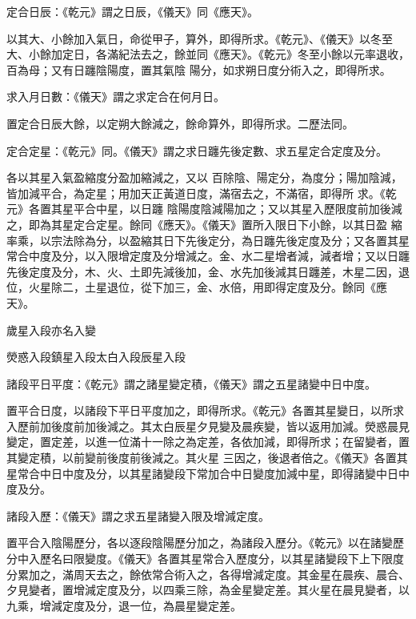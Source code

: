 \begin{pinyinscope}
 定合日辰：《乾元》謂之日辰，《儀天》同《應天》。



 以其大、小餘加入氣日，命從甲子，算外，即得所求。《乾元》、《儀天》以冬至大、小餘加定日，各滿紀法去之，餘並同《應天》。《乾元》冬至小餘以元率退收，百為母；又有日躔陰陽度，置其氣陰
 陽分，如求朔日度分術入之，即得所求。



 求入月日數：《儀天》謂之求定合在何月日。



 置定合日辰大餘，以定朔大餘減之，餘命算外，即得所求。二歷法同。



 定合定星：《乾元》同。《儀天》謂之求日躔先後定數、求五星定合定度及分。



 各以其星入氣盈縮度分盈加縮減之，又以
 百除陰、陽定分，為度分；陽加陰減，皆加減平合，為定星；用加天正黃道日度，滿宿去之，不滿宿，即得所
 求。《乾元》各置其星平合中星，以日躔
 陰陽度陰減陽加之；又以其星入歷限度前加後減之，即為其星定合定星。餘同《應天》。《儀天》置所入限日下小餘，以其日盈
 縮率乘，以宗法除為分，以盈縮其日下先後定分，為日躔先後定度及分；又各置其星常合中度及分，以入限增定度及分增減之。金、水二星增者減，減者增；又以日躔先後定度及分，木、火、土即先減後加，金、水先加後減其日躔差，木星二因，退位，火星除二，土星退位，從下加三，金、水倍，用即得定度及分。餘同《應天》。



 歲星入段亦名入變



 熒惑入段鎮星入段太白入段辰星入段



 諸段平日平度：《乾元》謂之諸星變定積，《儀天》謂之五星諸變中日中度。



 置平合日度，以諸段下平日平度加之，即得所求。《乾元》各置其星變日，以所求入歷前加後度前加後減之。其太白辰星夕見變及晨疾變，皆以返用加減。熒惑晨見變定，置定差，以進一位滿十一除之為定差，各依加減，即得所求；在留變者，置其變定積，以前變前後度前後減之。其火星
 三因之，後退者倍之。《儀天》各置其星常合中日中度及分，以其星諸變段下常加合中日變度加減中星，即得諸變中日中度及分。



 諸段入歷：《儀天》謂之求五星諸變入限及增減定度。



 置平合入陰陽歷分，各以逐段陰陽歷分加之，為諸段入歷分。《乾元》以在諸變歷分中入歷名曰限變度。《儀天》各置其星常合入歷度分，以其星諸變段下上下限度分累加之，滿周天去之，餘依常合術入之，各得增減定度。其金星在晨疾、晨合、夕見變者，置增減定度及分，以四乘三除，為金星變定差。其火星在晨見變者，以九乘，增減定度及分，退一位，為晨星變定差。




\end{pinyinscope}
